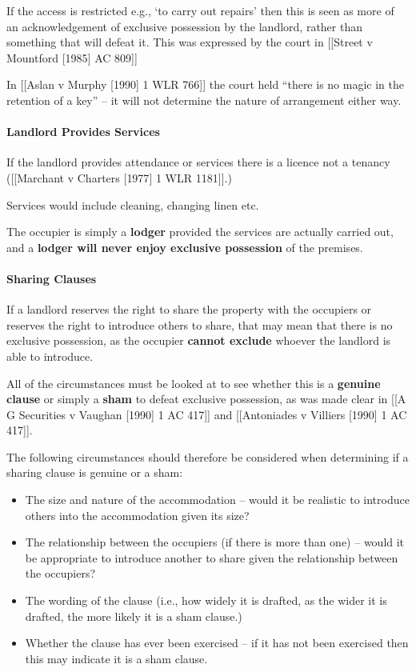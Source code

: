 \documentclass[
]{article}
\providecommand{\tightlist}{%
  \setlength{\itemsep}{0pt}\setlength{\parskip}{0pt}}
\begin{document}
If the access is restricted e.g., `to carry out repairs' then this is
seen as more of an acknowledgement of exclusive possession by the
landlord, rather than something that will defeat it. This was expressed
by the court in {[}{[}Street v Mountford {[}1985{]} AC 809{]}{]}

In {[}{[}Aslan v Murphy {[}1990{]} 1 WLR 766{]}{]} the court held
``there is no magic in the retention of a key'' -- it will not determine
the nature of arrangement either way.

\hypertarget{landlord-provides-services}{%
\paragraph{Landlord Provides
Services}\label{landlord-provides-services}}

If the landlord provides attendance or services there is a licence not a
tenancy ({[}{[}Marchant v Charters {[}1977{]} 1 WLR 1181{]}{]}.)

Services would include cleaning, changing linen etc.

The occupier is simply a \textbf{lodger} provided the services are
actually carried out, and a \textbf{lodger will never enjoy exclusive
possession} of the premises.

\hypertarget{sharing-clauses}{%
\paragraph{Sharing Clauses}\label{sharing-clauses}}

If a landlord reserves the right to share the property with the
occupiers or reserves the right to introduce others to share, that may
mean that there is no exclusive possession, as the occupier
\textbf{cannot exclude} whoever the landlord is able to introduce.

All of the circumstances must be looked at to see whether this is a
\textbf{genuine clause} or simply a \textbf{sham} to defeat exclusive
possession, as was made clear in {[}{[}A G Securities v Vaughan
{[}1990{]} 1 AC 417{]}{]} and {[}{[}Antoniades v Villiers {[}1990{]} 1
AC 417{]}{]}.

The following circumstances should therefore be considered when
determining if a sharing clause is genuine or a sham:

\begin{itemize}
\tightlist
\item
  The size and nature of the accommodation -- would it be realistic to
  introduce others into the accommodation given its size?
\item
  The relationship between the occupiers (if there is more than one) --
  would it be appropriate to introduce another to share given the
  relationship between the occupiers?
\item
  The wording of the clause (i.e., how widely it is drafted, as the
  wider it is drafted, the more likely it is a sham clause.)
\item
  Whether the clause has ever been exercised -- if it has not been
  exercised then this may indicate it is a sham clause.
\end{itemize}
\end{document}
